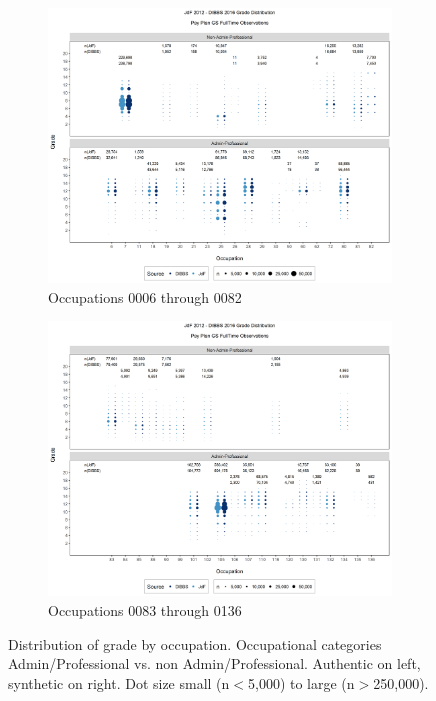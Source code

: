 \documentclass[10pt, letterpaper]{article}
\begin{document}
\begin{spacing}{1.0}
\clearpage

\begin{figure}[]
    \centering
    \begin{subfigure}{1\textwidth}
        \centering
        \includegraphics[width=6in, trim={0 0.55in 0 0.75in}, clip]{JdFDIBBSGSFullTimeGradeAdminProfessionalOccupation1.png}
        \caption{Occupations 0006 through 0082}
        \vspace{10pt}
    \end{subfigure}
    \begin{subfigure}{1\textwidth}
        \centering
        \includegraphics[width=6in, trim={0 0.55in 0 0.75in}, clip]{JdFDIBBSGSFullTimeGradeAdminProfessionalOccupation21.png}
        \caption{Occupations 0083 through 0136}
    \end{subfigure}
    \caption{Distribution of grade by occupation.  Occupational categories Admin/Professional vs. non Admin/Professional.  Authentic on left, synthetic on right.  Dot size small (n$<$5,000) to large (n$>$250,000).}
    \label{figure:JdFDIBBSGSFullTimeGradeAdminProfessionalOccupation}
\end{figure}


\end{spacing}
\end{document}

